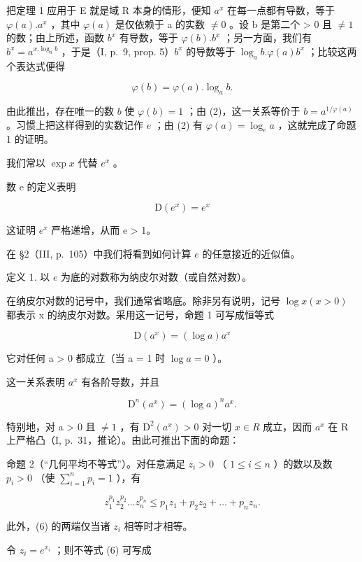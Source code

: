 把定理 1 应用于 E 就是域 R 本身的情形，便知 \(a^{x}\) 在每一点都有导数，等于 \(\varphi(a).a^{x}\) ，其中 \(\varphi(a)\) 是仅依赖于 a 的实数 \(\neq 0\) 。设 b 是第二个 \textgreater{} 0 且 \(\neq 1\) 的数；由上所述，函数 \(b^{x}\) 有导数，等于 \(\varphi(b).b^{x}\) ；另一方面，我们有 \(b^{x} = a^{x.\log_{a}b}\) ，于是（I, p.~9, prop. 5）\(b^{x}\) 的导数等于 \(\log_{a}b.\varphi(a)b^{x}\) ；比较这两个表达式便得

\[
\varphi (b) = \varphi (a). \log_ {a} b.\tag{2}
\]

由此推出，存在唯一的数 \(b\) 使 \(\varphi(b) = 1\) ；由 (2)，这一关系等价于 \(b = a^{1/\varphi(a)}\) 。习惯上把这样得到的实数记作 \(e\) ；由 (2) 有 \(\varphi(a) = \log_e a\) ，这就完成了命题 1 的证明。

我们常以 \(\exp x\) 代替 \(e^x\) 。

数 e 的定义表明

\[
\mathrm{D} (e ^ {x}) = e ^ {x}\tag{3}
\]

这证明 \(e^{x}\) 严格递增，从而 e \textgreater{} 1。

在 §2（III, p.~105）中我们将看到如何计算 \(e\) 的任意接近的近似值。

定义 1. 以 \(e\) 为底的对数称为纳皮尔对数（或自然对数）。

在纳皮尔对数的记号中，我们通常省略底。除非另有说明，记号 \(\log x (x > 0)\) 都表示 x 的纳皮尔对数。采用这一记号，命题 1 可写成恒等式

\[
\mathrm{D} \left(a ^ {x}\right) = (\log a) a ^ {x}\tag{4}
\]

它对任何 a \textgreater{} 0 都成立（当 a = 1 时 \(\log a = 0\) ）。

这一关系表明 \(a^x\) 有各阶导数，并且

\[
\mathrm{D} ^ {n} \left(a ^ {x}\right) = (\log a) ^ {n} a ^ {x}.\tag{5}
\]

特别地，对 a \textgreater{} 0 且 \(\neq 1\) ，有 \(\mathrm{D}^{2}(a^{x}) > 0\) 对一切 \(x \in R\) 成立，因而 \(a^{x}\) 在 R 上严格凸（I, p.~31，推论）。由此可推出下面的命题：

命题 2（“几何平均不等式”）。对任意满足 \(z_{i} > 0\) （ \(1 \leqslant i \leqslant n\) ）的数以及数 \(p_{i} > 0\) （使 \(\sum_{i=1}^{n} p_{i} = 1\) ），有

\[
z _ {1} ^ {p _ {1}} z _ {2} ^ {p _ {2}} \dots z _ {n} ^ {p _ {n}} \leqslant p _ {1} z _ {1} + p _ {2} z _ {2} + \dots + p _ {n} z _ {n}.\tag{6}
\]

此外，(6) 的两端仅当诸 \(z_{i}\) 相等时才相等。

令 \(z_{i} = e^{x_{i}}\) ；则不等式 (6) 可写成


